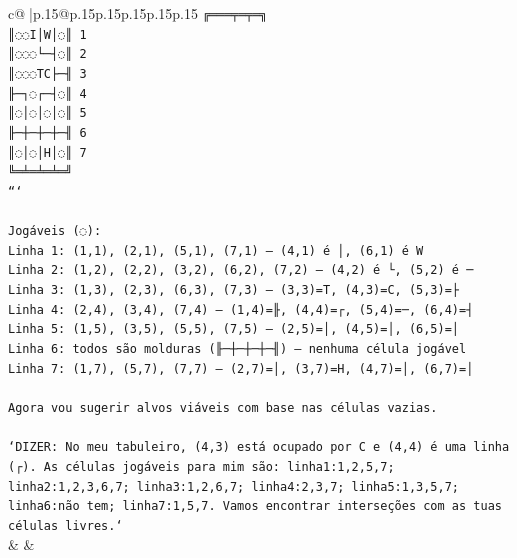 \documentclass{article}
\begin{document}
{\begin{supertabular}{c@{$\;$}|p{.15\linewidth}@{}p{.15\linewidth}p{.15\linewidth}p{.15\linewidth}p{.15\linewidth}p{.15\linewidth}}
{{{\texttt{╔═══╤═╤═╗} \\
\texttt{║◌◌I│W│◌║ 1} \\
\texttt{║◌◌◌└─┤◌║ 2} \\
\texttt{║◌◌◌TC├─╢ 3} \\
\texttt{╟─┐◌┌─┤◌║ 4} \\
\texttt{║◌│◌│◌│◌║ 5} \\
\texttt{╟─┼─┼─┼─╢ 6} \\
\texttt{║◌│◌│H│◌║ 7} \\
\texttt{╚═╧═╧═╧═╝} \\
\texttt{```} \\
\\ 
\texttt{Jogáveis (◌):} \\
\texttt{Linha 1: (1,1), (2,1), (5,1), (7,1) — (4,1) é │, (6,1) é W} \\
\texttt{Linha 2: (1,2), (2,2), (3,2), (6,2), (7,2) — (4,2) é └, (5,2) é ─} \\
\texttt{Linha 3: (1,3), (2,3), (6,3), (7,3) — (3,3)=T, (4,3)=C, (5,3)=├} \\
\texttt{Linha 4: (2,4), (3,4), (7,4) — (1,4)=╟, (4,4)=┌, (5,4)=─, (6,4)=┤} \\
\texttt{Linha 5: (1,5), (3,5), (5,5), (7,5) — (2,5)=│, (4,5)=│, (6,5)=│} \\
\texttt{Linha 6: todos são molduras (╟─┼─┼─┼─╢) — nenhuma célula jogável} \\
\texttt{Linha 7: (1,7), (5,7), (7,7) — (2,7)=│, (3,7)=H, (4,7)=│, (6,7)=│} \\
\\ 
\texttt{Agora vou sugerir alvos viáveis com base nas células vazias.} \\
\\ 
\texttt{`DIZER: No meu tabuleiro, (4,3) está ocupado por C e (4,4) é uma linha (┌). As células jogáveis para mim são: linha1:1,2,5,7; linha2:1,2,3,6,7; linha3:1,2,6,7; linha4:2,3,7; linha5:1,3,5,7; linha6:não tem; linha7:1,5,7. Vamos encontrar interseções com as tuas células livres.`} \\
            }
        }
    }
    & & \\ \\


\end{supertabular}}
\end{document}
